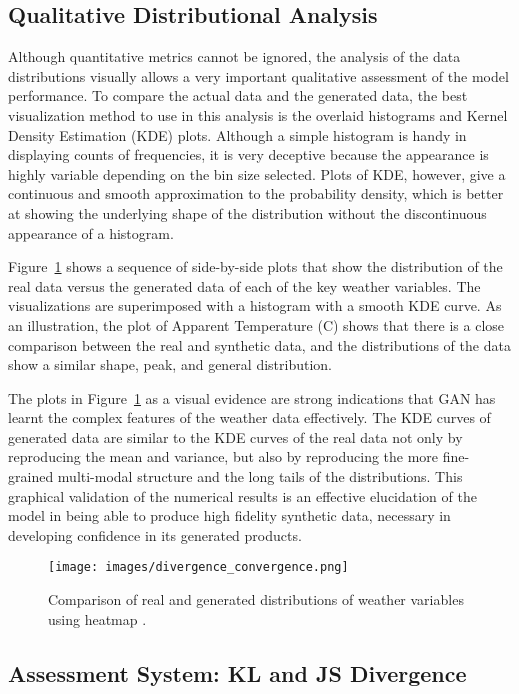 \documentclass[12pt, draftclsnofoot, onecolumn]{IEEEtran}
\begin{document}
\subsection{Qualitative Distributional Analysis}
Although quantitative metrics cannot be ignored, the analysis of the data distributions visually allows a very important qualitative assessment of the model performance. To compare the actual data and the generated data, the best visualization method to use in this analysis is the overlaid histograms and Kernel Density Estimation (KDE) plots. Although a simple histogram is handy in displaying counts of frequencies, it is very deceptive because the appearance is highly variable depending on the bin size selected. Plots of KDE, however, give a continuous and smooth approximation to the probability density, which is better at showing the underlying shape of the distribution without the discontinuous appearance of a histogram.  

Figure~\ref{fig:distribution_plots}  shows a sequence of side-by-side plots that show the distribution of the real data versus the generated data of each of the key weather variables. The visualizations are superimposed with a histogram with a smooth KDE curve. As an illustration, the plot of Apparent Temperature (C) shows that there is a close comparison between the real and synthetic data, and the distributions of the data show a similar shape, peak, and general distribution.

The plots in Figure~\ref{fig:distribution_plots} as a visual evidence are strong indications that GAN has learnt the complex features of the weather data effectively. The KDE curves of generated data are similar to the KDE curves of the real data not only by reproducing the mean and variance, but also by reproducing the more fine-grained multi-modal structure and the long tails of the distributions. This graphical validation of the numerical results is an effective elucidation of the model in being able to produce high fidelity synthetic data, necessary in developing confidence in its generated products.

\begin{figure}[H]
    \centering
    \texttt{[image: images/divergence\_convergence.png]}
    \caption{Comparison of real and generated distributions of weather variables using heatmap .}
    \label{fig:distribution_plots}
\end{figure}

\subsection{Assessment System: KL and JS Divergence}
\end{document}
